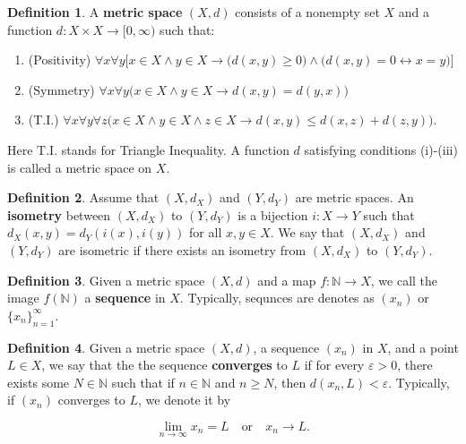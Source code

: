 \documentclass{article}
\theoremstyle{definition}
\newtheorem{definition}{Definition}[section]
\theoremstyle{remark}
\theoremstyle{definition}
\begin{document}
\begin{definition}
\label{df:1.1}
    A \textbf{metric space} $(X, d)$ consists of a nonempty set $X$ and a function $d\colon X\times X\rightarrow[0,\infty)$ such that:
    
    \begin{enumerate}[label=(\roman*)]
        \item (Positivity) $\forall x\forall y\big[x\in X\wedge y\in  X\rightarrow \big(d(x,y)\geq 0\big)\wedge\big(d(x,y)=0\leftrightarrow x=y\big)\big]$ 
        \item (Symmetry) $\forall x\forall y\big(x\in X\wedge y\in X\rightarrow d(x,y)=d(y,x)\big)$
        \item (T.I.) $\forall x\forall y\forall z\big(x\in X\wedge y\in X\wedge z\in X\rightarrow d(x,y)\leq d(x,z)+d(z,y)\big)$.
    \end{enumerate}
    
    \noindent Here T.I. stands for Triangle Inequality. A function $d$ satisfying conditions (i)-(iii) is called a metric space on $X$.
\end{definition}

\begin{definition}
\label{df:1.2}
    Assume that $(X, d_X)$ and $(Y, d_Y)$ are metric spaces. An \textbf{isometry} between $(X,d_X)$ to $(Y,d_Y)$ is a bijection $i\colon X\rightarrow Y$ such that $d_X(x,y)=d_Y(i(x),i(y))$ for all $x,y\in X$. We say that $(X, d_X)$ and $(Y,d_Y)$ are isometric if there exists an isometry from $(X,d_X)$ to $(Y,d_Y)$.
\end{definition}

\begin{definition}
\label{df:1.3}
    Given a metric space $(X,d)$ and a map $f\colon\mathbb{N}\rightarrow X$, we call the image $f(\mathbb{N})$ a \textbf{sequence} in $X$. Typically, sequnces are denotes as $(x_n)$ or $\{x_n\}_{n=1}^{\infty}$. 
\end{definition}

\begin{definition}
\label{df:1.4}
    Given a metric space $(X,d)$, a sequence $(x_n)$ in $X$, and a point $L\in X$, we say that the the sequence \textbf{converges} to $L$ if for every $\varepsilon>0$, there exists some $N\in\mathbb{N}$ such that if $n\in\mathbb{N}$ and $n\geq N$, then $d(x_n,L)<\varepsilon$. Typically, if $(x_n)$ converges to $L$, we denote it by 
    
    \begin{equation*}
        \lim_{n\rightarrow\infty}x_n=L\quad\text{or}\quad x_n\rightarrow L.
    \end{equation*}
\end{definition}
\end{document}
